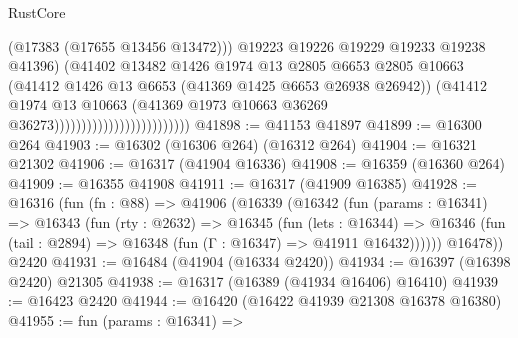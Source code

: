 \begin{lexlean}{RustCore}
\begin{coremodule}
                                                    (@17383 (@17655 @13456 @13472)))
                                                  @19223
                                                  @19226
                                                  @19229
                                                  @19233
                                                  @19238
                                                  @41396)
                                                (@41402
                                                  @13482
                                                  @1426
                                                  @1974
                                                  @13
                                                  @2805
                                                  @6653
                                                  @2805
                                                  @10663
                                                  (@41412
                                                    @1426
                                                    @13
                                                    @6653
                                                    (@41369 @1425 @6653 @26938 @26942))
                                                  (@41412
                                                    @1974
                                                    @13
                                                    @10663
                                                    (@41369
                                                      @1973
                                                      @10663
                                                      @36269
                                                      @36273)))))))))))))))))))))))))
@41898 := @41153 @41897
@41899 := @16300 @264
@41903 := @16302 (@16306 @264) (@16312 @264)
@41904 := @16321 @21302
@41906 := @16317 (@41904 @16336)
@41908 := @16359 (@16360 @264)
@41909 := @16355 @41908
@41911 := @16317 (@41909 @16385)
@41928 := @16316
    (fun (fn : @88) =>
    @41906
      (@16339
        (@16342
          (fun (params : @16341) =>
          @16343
            (fun (rty : @2632) =>
            @16345
              (fun (lets : @16344) =>
              @16346 (fun (tail : @2894) => @16348 (fun (Γ : @16347) => @41911 @16432))))))
        @16478))
    @2420
@41931 := @16484 (@41904 (@16334 @2420))
@41934 := @16397 (@16398 @2420) @21305
@41938 := @16317 (@16389 (@41934 @16406) @16410)
@41939 := @16423 @2420
@41944 := @16420 (@16422 @41939 @21308 @16378 @16380)
@41955 := fun (params : @16341) =>

\end{coremodule}
\end{lexlean}
